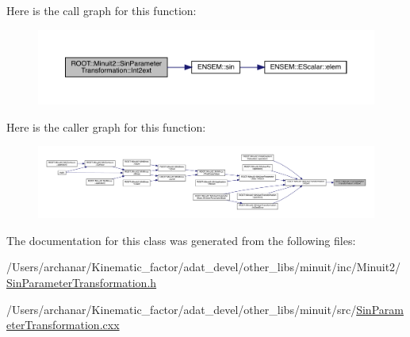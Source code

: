 Here is the call graph for this function\+:\nopagebreak
\begin{figure}[H]
\begin{center}
\leavevmode
\includegraphics[width=350pt]{de/d62/classROOT_1_1Minuit2_1_1SinParameterTransformation_a53590482bc5734d9f079c8c5054d3de6_cgraph}
\end{center}
\end{figure}
Here is the caller graph for this function\+:\nopagebreak
\begin{figure}[H]
\begin{center}
\leavevmode
\includegraphics[width=350pt]{de/d62/classROOT_1_1Minuit2_1_1SinParameterTransformation_a53590482bc5734d9f079c8c5054d3de6_icgraph}
\end{center}
\end{figure}


The documentation for this class was generated from the following files\+:\begin{DoxyCompactItemize}
\item 
/\+Users/archanar/\+Kinematic\+\_\+factor/adat\+\_\+devel/other\+\_\+libs/minuit/inc/\+Minuit2/\mbox{\hyperlink{other__libs_2minuit_2inc_2Minuit2_2SinParameterTransformation_8h}{Sin\+Parameter\+Transformation.\+h}}\item 
/\+Users/archanar/\+Kinematic\+\_\+factor/adat\+\_\+devel/other\+\_\+libs/minuit/src/\mbox{\hyperlink{SinParameterTransformation_8cxx}{Sin\+Parameter\+Transformation.\+cxx}}\end{DoxyCompactItemize}
